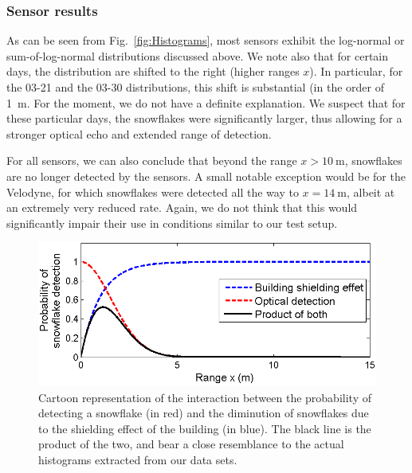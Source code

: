
\subsubsection{Sensor results}
As can be seen from Fig.~\ref{fig:Histograms}, most sensors exhibit the log-normal or sum-of-log-normal distributions discussed above. We note also that for certain days, the distribution are shifted to the right (higher ranges $x$). In particular, for the 03-21 and the 03-30 distributions, this shift is substantial (in the order of \SI{1}{\meter}. For the moment, we do not have a definite explanation. We suspect that for these particular days, the snowflakes were significantly larger, thus allowing for a stronger optical echo and extended range of detection. 

For all sensors, we can also conclude that beyond the range $x>\SI{10}{\meter}$, snowflakes are no longer detected by the sensors. A small notable exception would be for the Velodyne, for which snowflakes were detected all the way to $x=\SI{14}{\meter}$, albeit at an extremely very reduced rate. Again, we do not think that this would significantly impair their use in conditions similar to our test setup. 


\begin{figure}[th]
    \centering
    \includegraphics[width=0.97\linewidth]{./img/ShieldingModel.png}
    \caption{Cartoon representation of the interaction between the probability of detecting a snowflake (in red) and the diminution of snowflakes due to the shielding effect of the building (in blue). The black line is the product of the two, and bear a close resemblance to the actual histograms extracted from our data sets.}
    \label{fig:CartoonModel}
\end{figure}

